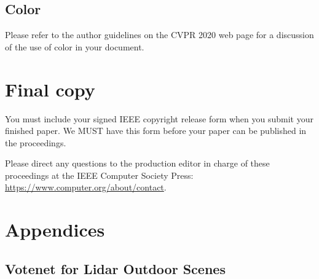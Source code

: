 \documentclass[10pt,twocolumn,letterpaper]{article}
\begin{document}
\subsection{Color}

Please refer to the author guidelines on the CVPR 2020 web page for a discussion
of the use of color in your document.

\section{Final copy}

You must include your signed IEEE copyright release form when you submit
your finished paper. We MUST have this form before your paper can be
published in the proceedings.

Please direct any questions to the production editor in charge of these 
proceedings at the IEEE Computer Society Press: 
\url{https://www.computer.org/about/contact}. 
\fi

{\small


}


\appendix
\section*{Appendices}
\renewcommand{\thesubsection}{\Alph{subsection}}

\subsection{Votenet for Lidar Outdoor Scenes}\label{apendix:votenet}
\end{document}
